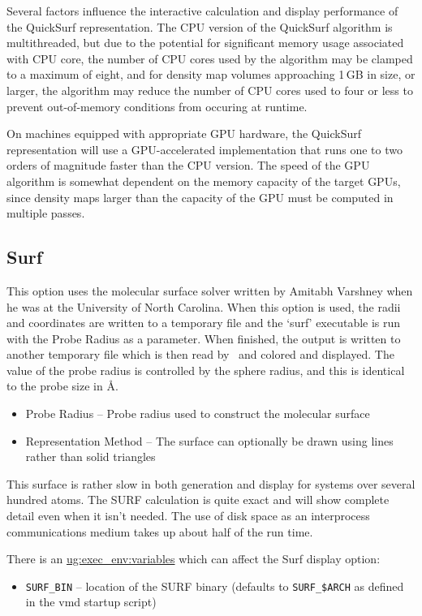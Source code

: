 Several factors influence the interactive calculation and display
performance of the QuickSurf representation.  The CPU version of the
QuickSurf algorithm is multithreaded, but due to the potential for 
significant memory usage associated with CPU core, the number of CPU 
cores used by the algorithm may be clamped to a maximum of eight,
and for density map volumes approaching 1\,GB in size, or larger,
the algorithm may reduce the number of CPU cores used to four or less
to prevent out-of-memory conditions from occuring at runtime.

On machines equipped with appropriate GPU hardware, the QuickSurf 
representation will use a GPU-accelerated implementation that runs
one to two orders of magnitude faster than the CPU version.  The speed
of the GPU algorithm is somewhat dependent on the memory capacity 
of the target GPUs, since density maps larger than the capacity of the
GPU must be computed in multiple passes.

\subsection{Surf}
\label{ug:topic:drawmethods:surf}
This option uses the molecular surface solver written by Amitabh
Varshney when he was at the University of North Carolina.  When this
option is used, the radii and coordinates are written to a temporary
file and the `surf' executable is run with the {\sf Probe Radius} as a
parameter.  When finished, the output is written to another temporary
file which is then read by \VMD\ and colored and displayed.  The value
of the probe radius is controlled by the sphere radius, and this
is identical to the probe size in \AA.

\begin{itemize}
\item Probe Radius -- Probe radius used to construct the molecular surface
\item Representation Method -- The surface can optionally be drawn using
lines rather than solid triangles
\end{itemize}

This surface is rather slow in both generation and display for systems
over several hundred atoms.  The SURF calculation is quite exact and
will show complete detail even when it isn't needed.  The use of disk
space as an interprocess communications medium takes up about half of
the run time.

There is an \hyperref{environment variable}{environment variable
[\S~}{]}{ug:exec_env:variables}  which can affect the Surf display option:
\begin{itemize}
  \item{\tt SURF\_BIN} -- location of the SURF binary (defaults to
                       {\tt SURF\_\$ARCH} as defined in the vmd startup script)
\end{itemize}

